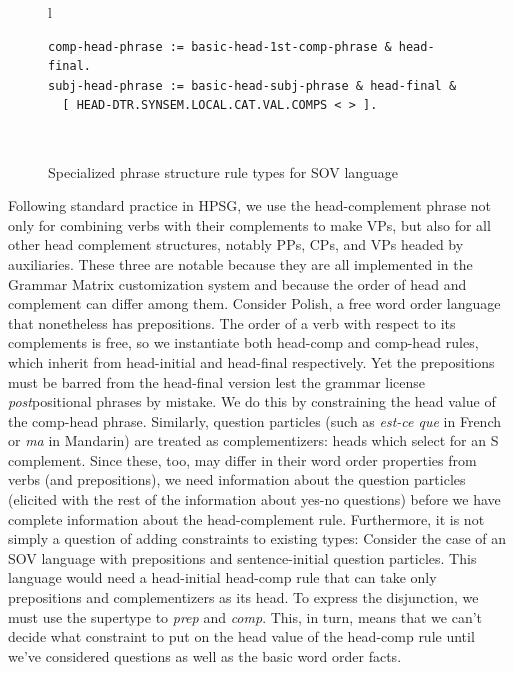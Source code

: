 \documentclass[11pt]{article}
\begin{document}
\begin{figure}[ht]
\small
\begin{center}
\begin{tabular}{l}
\begin{minipage}{5in}
\begin{verbatim}
comp-head-phrase := basic-head-1st-comp-phrase & head-final.
subj-head-phrase := basic-head-subj-phrase & head-final &
  [ HEAD-DTR.SYNSEM.LOCAL.CAT.VAL.COMPS < > ].
\end{verbatim}
\end{minipage}\\
\end{tabular}
\end{center}
\caption{Specialized phrase structure rule types for SOV language}
\label{tdlfig}
\end{figure}

Following standard practice in HPSG, we use the head-complement phrase
not only for combining verbs with their complements to make VPs, but
also for all other head complement structures, notably PPs, CPs, and
VPs headed by auxiliaries.  These three are notable because they are
all implemented in the Grammar Matrix customization system and
because the order of head and complement can differ among them.
Consider Polish, a free word order language that nonetheless has
prepositions.  The order of a verb with respect to its complements is
free, so we instantiate both head-comp and comp-head rules, which
inherit from head-initial and head-final respectively. Yet the
prepositions must be barred from the head-final version lest the
grammar license {\it post}positional phrases by mistake. We do this by
constraining the {\sc head} value of the comp-head phrase.  Similarly,
question particles (such as {\it est-ce que} in French or {\it ma} in
Mandarin) are treated as complementizers: heads which select for an S
complement.  Since these, too, may differ in their word order
properties from verbs (and prepositions), we need information about
the question particles (elicited with the rest of the information
about yes-no questions) before we have complete information about the
head-complement rule.  Furthermore, it is not simply a question of
adding constraints to existing types: Consider the case of an SOV
language with prepositions and sentence-initial question particles.
This language would need a head-initial head-comp rule that can take
only prepositions and complementizers as its head.  To express the
disjunction, we must use the supertype to {\it prep} and {\it
comp}.  This, in turn, means that we can't decide what constraint to
put on the head value of the head-comp rule until we've considered
questions as well as the basic word order facts.
\end{document}

